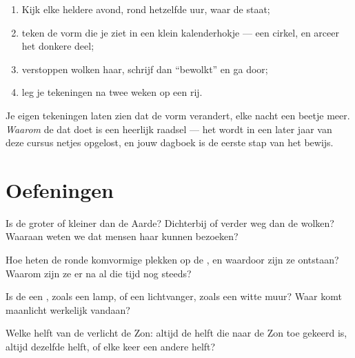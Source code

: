 \begin{method}\label{met:g2:moon-in-the-sky:diary}
\begin{enumerate}
  \item Kijk elke heldere avond, rond hetzelfde uur, waar de
         staat;
  \item teken de vorm die je ziet in een klein kalenderhokje --- een
        cirkel, en arceer het donkere deel;
  \item verstoppen wolken haar, schrijf dan ``bewolkt'' en ga door;
  \item leg je tekeningen na twee weken op een rij.
\end{enumerate}
Je eigen tekeningen laten zien dat de vorm verandert, elke nacht een
beetje meer. \emph{Waarom} de  dat doet is een heerlijk raadsel ---
het wordt in een later jaar van deze cursus netjes opgelost, en jouw
dagboek is de eerste stap van het bewijs.
\end{method}

\section{Oefeningen}

\begin{exercise}[$\star$]\label{exo:g2:moon-in-the-sky:1}
Is de  groter of kleiner dan de Aarde? Dichterbij of verder weg
dan de wolken? Waaraan weten we dat mensen haar kunnen bezoeken?
\end{exercise}

\begin{exercise}[$\star$]\label{exo:g2:moon-in-the-sky:2}
Hoe heten de ronde komvormige plekken op de , en waardoor zijn ze
ontstaan? Waarom zijn ze er na al die tijd nog steeds?
\end{exercise}

\begin{exercise}[$\star$]\label{exo:g2:moon-in-the-sky:3}
Is de  een , zoals een lamp, of een lichtvanger, zoals
een witte muur? Waar komt maanlicht werkelijk vandaan?
\end{exercise}

\begin{exercise}[$\star$]\label{exo:g2:moon-in-the-sky:4}
Welke helft van de  verlicht de Zon: altijd de helft die naar de
Zon toe gekeerd is, altijd dezelfde helft, of elke keer een andere
helft?
\end{exercise}

